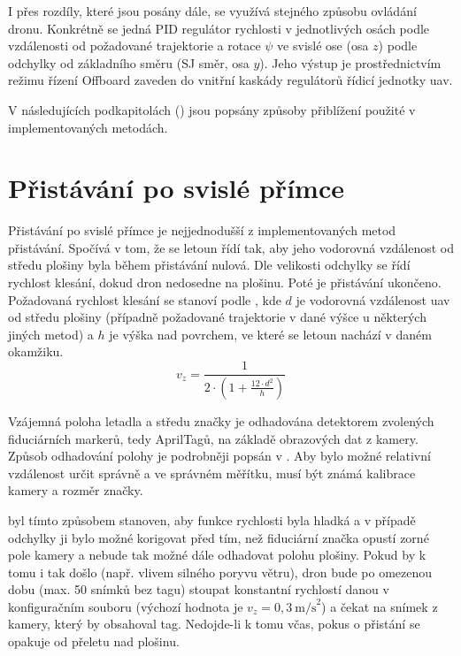     I přes rozdíly, které jsou posány dále, se využívá stejného způsobu ovládání dronu. Konkrétně se jedná PID regulátor rychlosti v jednotlivých osách podle vzdálenosti od požadované trajektorie a rotace $\psi$ ve svislé ose (osa $z$) podle odchylky od základního směru (SJ směr, osa $y$). Jeho výstup je prostřednictvím režimu řízení Offboard zaveden do vnitřní kaskády regulátorů řídicí jednotky \acrshort{uav}.
    
    V následujících podkapitolách () jsou popsány způsoby přiblížení použité v implementovaných metodách.

    \section{Přistávání po svislé přímce} \label{sec:offboardpid}
        Přistávání po svislé přímce je nejjednodušší z implementovaných metod přistávání. Spočívá v tom, že se letoun řídí tak, aby jeho vodorovná vzdálenost od středu plošiny byla během přistávání nulová. Dle velikosti odchylky se řídí rychlost klesání, dokud dron nedosedne na plošinu. Poté je přistávání ukončeno. Požadovaná rychlost klesání se stanoví podle , kde $d$ je vodorovná vzdálenost \acrshort{uav} od středu plošiny (případně požadované trajektorie v dané výšce u některých jiných metod) a $h$ je výška nad povrchem, ve které se letoun nachází v daném okamžiku.
        \begin{equation} \label{eq:vz}
            v_z = \frac{1}{2\cdot\left(1+\frac{12\cdot d^2}{h}\right)}
        \end{equation}

        Vzájemná poloha letadla a středu značky je odhadována detektorem zvolených fiduciárních markerů, tedy AprilTagů, na základě obrazových dat z kamery. Způsob odhadování polohy je podrobněji popsán v . Aby bylo možné relativní vzdálenost určit správně a ve správném měřítku, musí být známá kalibrace kamery a rozměr značky.

         byl tímto způsobem stanoven, aby funkce rychlosti byla hladká a v případě odchylky ji bylo možné korigovat před tím, než fiduciární značka opustí zorné pole kamery a nebude tak možné dále odhadovat polohu plošiny. Pokud by k tomu i tak došlo (např. vlivem silného poryvu větru), dron bude po omezenou dobu (max. 50 snímků bez tagu) stoupat konstantní rychlostí danou v konfiguračním souboru (výchozí hodnota je $v_z=0{,}3~\mathrm{m/s}^2$) a čekat na snímek z kamery, který by obsahoval tag. Nedojde-li k tomu včas, pokus o přistání se opakuje od přeletu nad plošinu. %
        
